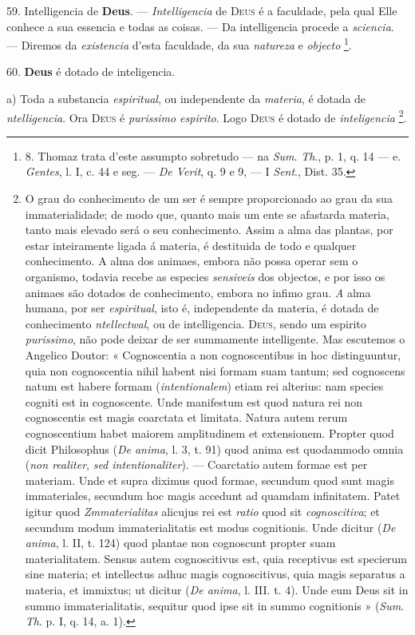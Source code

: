 59. Intelligencia de \textbf{Deus}. --- \emph{Intelligencia} de \textsc{Deus} é a faculdade, pela qual Elle conhece a sua essencia e todas as coisas. --- Da intelligencia procede a \emph{sciencia}. --- Diremos da \emph{existencia} d'esta faculdade, da sua \emph{natureza} e \emph{objecto} \footnote{8. Thomaz trata d'este assumpto sobretudo --- na \emph{Sum}. \emph{Th}., p. 1, q. 14 --- e. \emph{Gentes}, l. I, c. 44 e seg. --- \emph{De Verit}, q. 9 e 9, --- I \emph{Sent}., Dist. 35.}.

60. \textbf{Deus} é dotado de inteligencia.

a) Toda a substancia \emph{espiritual}, ou independente da \emph{materia}, é dotada de \emph{ntelligencia}. Ora \textsc{Deus} é \emph{purissimo espirito}. Logo \textsc{Deus} é dotado de \emph{inteligencia} \footnote{O grau do conhecimento de um ser é sempre proporcionado ao grau da sua immaterialidade; de modo que, quanto mais um ente se afastarda materia, tanto mais elevado será o seu conhecimento. Assim a alma das plantas, por estar inteiramente ligada á materia, é destituida de todo e qualquer conhecimento. A alma dos animaes, embora não possa operar sem o organismo, todavia recebe as especies \emph{sensiveis} dos objectos, e por isso os animaes são dotados de conhecimento, embora no infimo grau. \emph{A} alma humana, por ser \emph{espiritual}, isto é, independente da materia, é dotada de conhecimento \emph{ntellectwal}, ou de intelligencia. \textsc{Deus}, sendo um espirito \emph{purissimo}, não pode deixar de ser summamente intelligente. Mas escutemos o Angelico Doutor: « Cognoscentia a non cognoscentibus in hoc distinguuntur, quia non cognoscentia nihil habent nisi formam suam tantum; sed cognoscens natum est habere formam (\emph{intentionalem}) etiam rei alterius: nam species cogniti est in cognoscente. Unde manifestum est quod natura rei non cognoscentis est magis coarctata et limitata. Natura autem rerum cognoscentium habet maiorem amplitudinem et extensionem. Propter quod dicit Philosophus (\emph{De anima}, l. 3, t. 91) quod anima est quodammodo omnia (\emph{non realiter}, \emph{sed intentionaliter}). --- Coarctatio autem formae est per materiam. Unde et supra diximus quod formae, secundum quod sunt magis immateriales, secundum hoc magis accedunt ad quamdam infinitatem. Patet igitur quod \emph{Zmmaterialitas} alicujus rei est \emph{ratio} quod sit \emph{cognoscitiva}; et secundum modum immaterialitatis est modus cognitionis. Unde dicitur (\emph{De anima}, l. II, t. 124) quod plantae non cognoscunt propter suam materialitatem. Sensus autem cognoscitivus est, quia receptivus est specierum sine materia; et intellectus adhuc magis cognoscitivus, quia magis separatus a materia, et immixtus; ut dicitur (\emph{De anima}, l. III. t. 4). Unde eum Deus sit in summo immaterialitatis, sequitur quod ipse sit in summo cognitionis » (\emph{Sum}. \emph{Th}. p. I, q. 14, a. 1).}.

